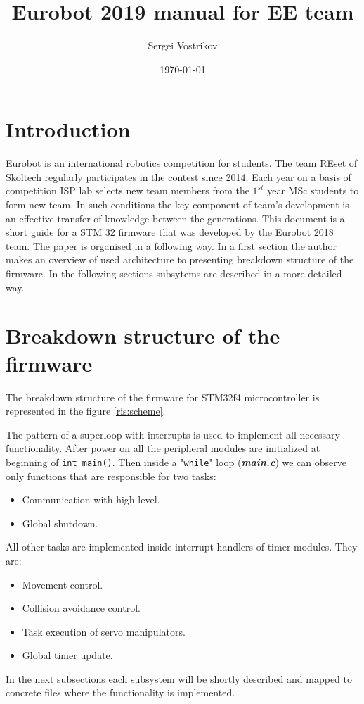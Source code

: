 \documentclass[a4paper,12pt]{article} %
\author{Sergei Vostrikov}
\title{Eurobot 2019 manual for EE team}
\date{\today}
\newcommand{\textitbf}[1]{\textbf{\textit{#1}}}
\newcommand{\inlinecode}[1]{\lstinline{#1}}
\begin{document}

\maketitle

\newpage
\tableofcontents
\newpage
\section*{Introduction}
Eurobot is an international robotics competition for students. The team REset of Skoltech regularly participates in the contest since 2014. Each year on a basis of competition ISP lab selects new team members from the $1^{st}$ year MSc students to form new team. In such conditions the key component of team's development is an effective transfer of knowledge between the generations. This document is a short guide for a STM 32 firmware that was developed by the Eurobot 2018 team. The paper is organised in a following way. In a first section the author makes an overview of used architecture to presenting breakdown structure of the firmware. In the following sections subsytems are described in a more detailed way.

\section{Breakdown structure of the firmware}
The breakdown structure of the firmware for STM32f4 microcontroller is represented in the figure \ref{ris:scheme}. 

The pattern of a superloop with interrupts is used to implement all necessary functionality. After power on all the peripheral modules are initialized at beginning of \inlinecode{int main()}. Then inside a "\inlinecode{while}" loop (\textitbf{main.c}) we can observe only functions that are responsible for two tasks:
\begin{itemize}
	\item Communication with high level.
	\item Global shutdown.
\end{itemize}
All other tasks are implemented inside interrupt handlers of timer modules. They are:
\begin{itemize}
	\item Movement control.
	\item Collision avoidance control.
	\item Task execution of servo manipulators.
	\item Global timer update.
\end{itemize}
In the next subsections each subsystem will be shortly described and mapped to concrete files where the functionality is implemented.
\end{document}
